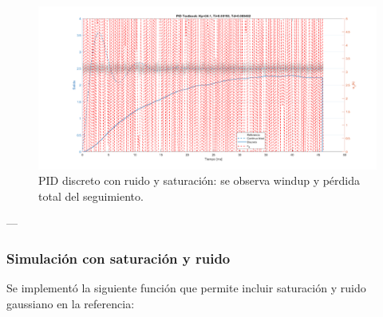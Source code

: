 \begin{figure}[!t]
	\centering
	\includegraphics[width=\columnwidth]{img/sat_noise.png}
	\caption{PID discreto con ruido y saturación: se observa windup y pérdida total del seguimiento.}
	\label{fig:sat_noise}
\end{figure}

---

\subsubsection*{Simulación con saturación y ruido}

Se implementó la siguiente función que permite incluir saturación y ruido gaussiano en la referencia:

